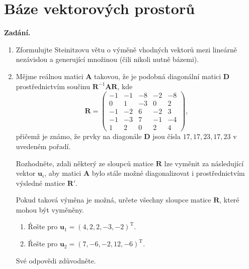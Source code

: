 \section{Báze vektorových prostorů}

\noindent\textbf{Zadání.}\par
\begin{enumerate}
  \item Zformulujte Steinitzovu větu o výměně vhodných vektorů mezi lineárně nezávislou a generující množinou (čili nikoli nutně bázemi).
  \item Mějme reálnou matici $\mathbf{A}$ takovou, že je podobná diagonální matici $\mathbf{D}$ prostřednictvím součinu $\mathbf{R}^{-1} \mathbf{A} \mathbf{R}$, kde
    \[
      \mathbf{R} = \begin{pmatrix}
        -1 & -1 & -8 & -2 & -8 \\
        0 & 1 & -3 & 0 & 2 \\
        -1 & -2 & 6 & -2 & 3 \\
        -1 & -3 & 7 & -1 & -4 \\
        1 & 2 & 0 & 2 & 4
      \end{pmatrix},
    \]
    přičemž je známo, že prvky na diagonále $\mathbf{D}$ jsou čísla $17, 17, 23, 17, 23$ v uvedeném pořadí.

    Rozhodněte, zdali některý ze sloupců matice $\mathbf{R}$ lze vyměnit za následující vektor $\mathbf{u}_i$, aby matici $\mathbf{A}$ bylo stále možné diagonalizovat i prostřednictvím výsledné matice $\mathbf{R}'$.

    Pokud taková výměna je možná, určete všechny sloupce matice $\mathbf{R}$, které mohou být vyměněny.
    \begin{enumerate}
      \item[(a)] Řešte pro $\mathbf{u}_1 = (4,2,2,-3,-2)^{\mathrm{T}}$.
      \item[(b)] Řešte pro $\mathbf{u}_2 = (7,-6,-2,12,-6)^{\mathrm{T}}$.
    \end{enumerate}
    Své odpovědi zdůvodněte.
\end{enumerate}

